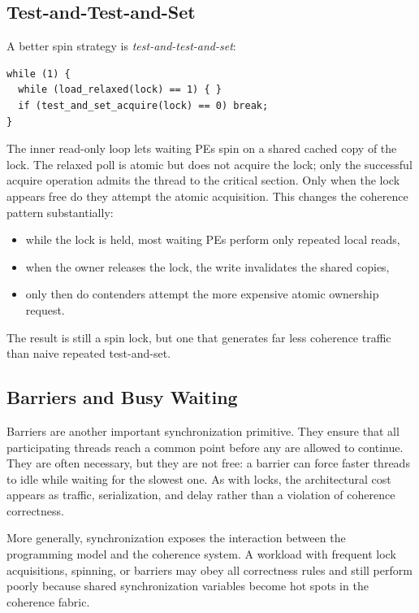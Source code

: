 \subsection*{Test-and-Test-and-Set}
A better spin strategy is \textit{test-and-test-and-set}:
\begin{verbatim}
while (1) {
  while (load_relaxed(lock) == 1) { }
  if (test_and_set_acquire(lock) == 0) break;
}
\end{verbatim}
The inner read-only loop lets waiting PEs spin on a shared cached copy of the lock.
The relaxed poll is atomic but does not acquire the lock; only the successful acquire operation admits the thread to the critical section.
Only when the lock appears free do they attempt the atomic acquisition.
This changes the coherence pattern substantially:
\begin{itemize}
    \item while the lock is held, most waiting PEs perform only repeated local reads,
    \item when the owner releases the lock, the write invalidates the shared copies,
    \item only then do contenders attempt the more expensive atomic ownership request.
\end{itemize}
The result is still a spin lock, but one that generates far less coherence traffic than naive repeated test-and-set.

\subsection*{Barriers and Busy Waiting}
Barriers are another important synchronization primitive.
They ensure that all participating threads reach a common point before any are allowed to continue.
They are often necessary, but they are not free: a barrier can force faster threads to idle while waiting for the slowest one.
As with locks, the architectural cost appears as traffic, serialization, and delay rather than a violation of coherence correctness.

More generally, synchronization exposes the interaction between the programming model and the coherence system.
A workload with frequent lock acquisitions, spinning, or barriers may obey all correctness rules and still perform poorly because shared synchronization variables become hot spots in the coherence fabric.


